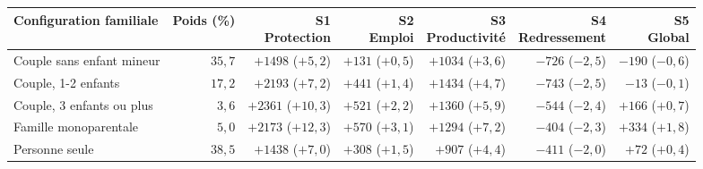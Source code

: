\begin{tabular}{p{4.2cm}rrrrrr}\toprule Configuration familiale & Poids (\%) & \makecell{S1\\Protection} & \makecell{S2\\Emploi} & \makecell{S3\\Productivité} & \makecell{S4\\Redressement} & \makecell{S5\\Global}\\ \midrule
Couple sans enfant mineur & $35{,}7$ & $+1498$ ($+5{,}2$) & $+131$ ($+0{,}5$) & $+1034$ ($+3{,}6$) & $-726$ ($-2{,}5$) & $-190$ ($-0{,}6$)\\
Couple, 1-2 enfants & $17{,}2$ & $+2193$ ($+7{,}2$) & $+441$ ($+1{,}4$) & $+1434$ ($+4{,}7$) & $-743$ ($-2{,}5$) & $-13$ ($-0{,}1$)\\
Couple, 3 enfants ou plus & $3{,}6$ & $+2361$ ($+10{,}3$) & $+521$ ($+2{,}2$) & $+1360$ ($+5{,}9$) & $-544$ ($-2{,}4$) & $+166$ ($+0{,}7$)\\
Famille monoparentale & $5{,}0$ & $+2173$ ($+12{,}3$) & $+570$ ($+3{,}1$) & $+1294$ ($+7{,}2$) & $-404$ ($-2{,}3$) & $+334$ ($+1{,}8$)\\
Personne seule & $38{,}5$ & $+1438$ ($+7{,}0$) & $+308$ ($+1{,}5$) & $+907$ ($+4{,}4$) & $-411$ ($-2{,}0$) & $+72$ ($+0{,}4$)\\\bottomrule\end{tabular}